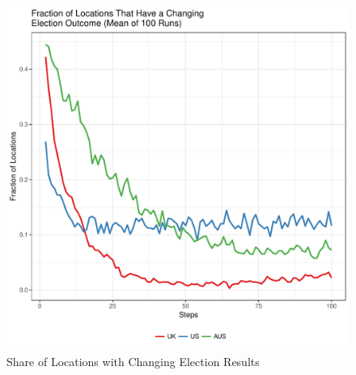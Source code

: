 \documentclass[12pt, a4paper]{article}
\begin{document}
	\begin{figure}[bp!]
		\centering
		\caption{Share of Locations with Changing Election Results}
		\includegraphics[scale=0.6]{./Plots/election_plot.pdf}
	\end{figure}
	
\end{document}
